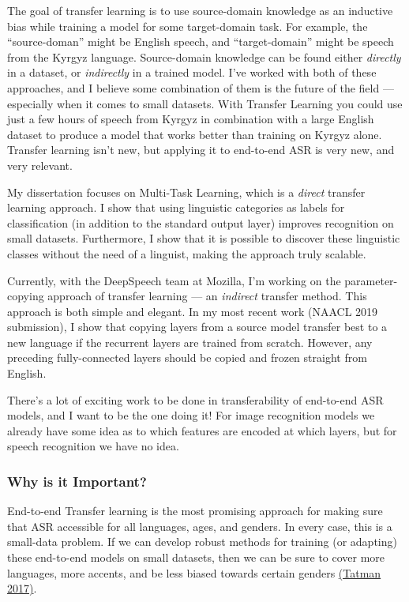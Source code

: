 \documentclass[12pt,a4paper]{article}
\begin{document}
The goal of transfer learning is to use source-domain knowledge as an inductive bias while training a model for some target-domain task. For example, the ``source-doman'' might be English speech, and ``target-domain'' might be speech from the Kyrgyz language. Source-domain knowledge can be found either \textit{directly} in a dataset, or \textit{indirectly} in a trained model. I've worked with both of these approaches, and I believe some combination of them is the future of the field --- especially when it comes to small datasets. With Transfer Learning you could use just a few hours of speech from Kyrgyz in combination with a large English dataset to produce a model that works better than training on Kyrgyz alone. Transfer learning isn't new, but applying it to end-to-end ASR is very new, and very relevant.

My dissertation focuses on Multi-Task Learning, which is a \textit{direct} transfer learning approach. I show that using linguistic categories as labels for classification (in addition to the standard output layer) improves recognition on small datasets. Furthermore, I show that it is possible to discover these linguistic classes without the need of a linguist, making the approach truly scalable.

Currently, with the DeepSpeech team at Mozilla, I'm working on the parameter-copying approach of transfer learning --- an \textit{indirect} transfer method. This approach is both simple and elegant. In my most recent work (NAACL 2019 submission), I show that copying layers from a source model transfer best to a new language if the recurrent layers are trained from scratch. However, any preceding fully-connected layers should be copied and frozen straight from English.

There's a lot of exciting work to be done in transferability of end-to-end ASR models, and I want to be the one doing it! For image recognition models we already have some idea as to which features are encoded at which layers, but for speech recognition we have no idea.

\subsubsection*{Why is it Important?}

End-to-end Transfer learning is the most promising approach for making sure that ASR accessible for all languages, ages, and genders. In every case, this is a small-data problem. If we can develop robust methods for training (or adapting) these end-to-end models on small datasets, then we can be sure to cover more languages, more accents, and be less biased towards certain genders \href{http://www.aclweb.org/anthology/W17-1606}{(Tatman 2017)}.
\end{document}
